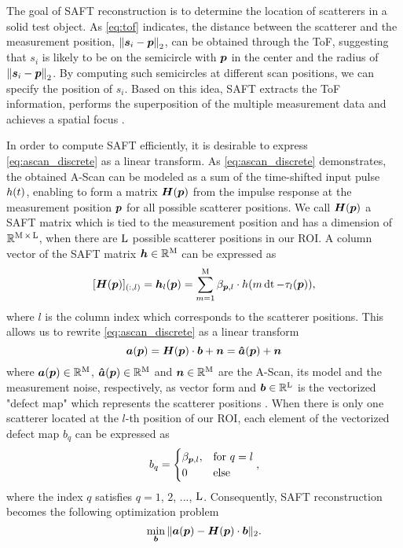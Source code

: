 The goal of SAFT reconstruction is to determine the location of scatterers in a solid test object. As \eqref{eq:tof} indicates, the distance between the scatterer and the measurement position, $\left\lVert\bm{s}_{i} - \bm{p} \right\rVert_{2}$, can be obtained through the ToF, suggesting that $s_i$ is likely to be on the semicircle with $\bm{p}$ in the center and the radius of $\left\lVert\bm{s}_{i} - \bm{p} \right\rVert_{2}$. By computing such semicircles at different scan positions, we can specify the position of $s_i$. Based on this idea, SAFT extracts the ToF information, performs the superposition of the multiple measurement data and achieves a spatial focus \cite{Lingvall04PhD}. \par

In order to compute SAFT efficiently, it is desirable to express \eqref{eq:ascan_discrete} as a linear transform. As \eqref{eq:ascan_discrete} demonstrates, the obtained A-Scan can be modeled as a sum of the time-shifted input pulse $h (t)$, enabling to form a matrix $\bm{H} (\bm{p})$ from the impulse response at the measurement position $\bm{p}$ for all possible scatterer positions. We call $\bm{H} (\bm{p})$ a SAFT matrix which is tied to the measurement position and has a dimension of ${\mathbb{R}}^{\operatorname{M} \times \operatorname{L}}$, when there are $\operatorname{L}$ possible scatterer positions in our ROI. A column vector of the SAFT matrix $\bm{h} \in {\mathbb{R}}^{\operatorname{M}}$ can be expressed as
\begin{equation} \label{eq:saft_colvec}
[\SAFTp]_{(:, l)} = \SAFTcol (\pp) = \sum_{m = 1}^{\M} \refcoeff_{\pp, l} \cdot \pulse (m \dt - \tau_{l} (\pp)),
\end{equation}
where $l$ is the column index which corresponds to the scatterer positions.
%
This allows us to rewrite \eqref{eq:ascan_discrete} as a linear transform
\begin{equation} \label{eq:saft_LT}
\ascanvec (\pp) = \SAFTp \cdot \defect + \noisevec = \ascanvechat (\pp) + \noisevec
\end{equation}
where $\bm{a} (\bm{p}) \in {\mathbb{R}}^{\operatorname{M}}$, $\bm{\hat{a}} (\bm{p}) \in {\mathbb{R}}^{\operatorname{M}}$ and $\bm{n} \in {\mathbb{R}}^{\operatorname{M}}$ are the A-Scan, its model and the measurement noise, respectively, as vector form and $\bm{b} \in {\mathbb{R}}^{\operatorname{L}}$ is the vectorized "defect map" which represents the scatterer positions \cite{Kirchhof16IUS}.
%
When there is only one scatterer located at the $l$-th position of our ROI, each element of the vectorized defect map $b_{q}$ can be expressed as 
\begin{equation} \label{eq:defect_map}
b_{q} = 
\begin{cases}
\refcoeff_{\pp, l}, & \text{for } q = l\\
0 & \text{else}
\end{cases},
\end{equation}
where the index $q$ satisfies $q = 1$, $2$, ..., $\operatorname{L}$. 
%
Consequently, SAFT reconstruction becomes the following optimization problem \cite{Kirchhof16IUS}
\begin{equation} \label{eq:saft_optimization}
\min_{\defect} \| \ascanvec (\pp) -  \SAFTp \cdot \defect \|_{2} .
\end{equation}